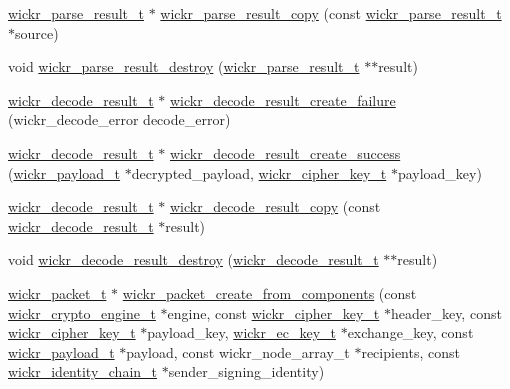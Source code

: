 \begin{DoxyCompactItemize}
\item 
\hyperlink{structwickr__parse__result}{wickr\+\_\+parse\+\_\+result\+\_\+t} $\ast$ \hyperlink{group__wickr__protocol_ga1671066ddc19b38ed05d4460d5a96706}{wickr\+\_\+parse\+\_\+result\+\_\+copy} (const \hyperlink{structwickr__parse__result}{wickr\+\_\+parse\+\_\+result\+\_\+t} $\ast$source)
\item 
void \hyperlink{group__wickr__protocol_ga706d39419c8991f417f37f556cee8df9}{wickr\+\_\+parse\+\_\+result\+\_\+destroy} (\hyperlink{structwickr__parse__result}{wickr\+\_\+parse\+\_\+result\+\_\+t} $\ast$$\ast$result)
\item 
\hyperlink{structwickr__decode__result}{wickr\+\_\+decode\+\_\+result\+\_\+t} $\ast$ \hyperlink{group__wickr__protocol_ga2bd6f49ed993d2290aaafa514eba43ed}{wickr\+\_\+decode\+\_\+result\+\_\+create\+\_\+failure} (wickr\+\_\+decode\+\_\+error decode\+\_\+error)
\item 
\hyperlink{structwickr__decode__result}{wickr\+\_\+decode\+\_\+result\+\_\+t} $\ast$ \hyperlink{group__wickr__protocol_ga633aaf4cb6159be0110401f06dae458c}{wickr\+\_\+decode\+\_\+result\+\_\+create\+\_\+success} (\hyperlink{structwickr__payload}{wickr\+\_\+payload\+\_\+t} $\ast$decrypted\+\_\+payload, \hyperlink{structwickr__cipher__key}{wickr\+\_\+cipher\+\_\+key\+\_\+t} $\ast$payload\+\_\+key)
\item 
\hyperlink{structwickr__decode__result}{wickr\+\_\+decode\+\_\+result\+\_\+t} $\ast$ \hyperlink{group__wickr__protocol_ga36183bf96372661f890aefbe388bd32a}{wickr\+\_\+decode\+\_\+result\+\_\+copy} (const \hyperlink{structwickr__decode__result}{wickr\+\_\+decode\+\_\+result\+\_\+t} $\ast$result)
\item 
void \hyperlink{group__wickr__protocol_ga94154ab44a6c2e9b97a115e37416efe1}{wickr\+\_\+decode\+\_\+result\+\_\+destroy} (\hyperlink{structwickr__decode__result}{wickr\+\_\+decode\+\_\+result\+\_\+t} $\ast$$\ast$result)
\item 
\hyperlink{structwickr__packet}{wickr\+\_\+packet\+\_\+t} $\ast$ \hyperlink{group__wickr__protocol_gaa1b1db03ca4b5b4109825539e6fead2f}{wickr\+\_\+packet\+\_\+create\+\_\+from\+\_\+components} (const \hyperlink{structwickr__crypto__engine}{wickr\+\_\+crypto\+\_\+engine\+\_\+t} $\ast$engine, const \hyperlink{structwickr__cipher__key}{wickr\+\_\+cipher\+\_\+key\+\_\+t} $\ast$header\+\_\+key, const \hyperlink{structwickr__cipher__key}{wickr\+\_\+cipher\+\_\+key\+\_\+t} $\ast$payload\+\_\+key, \hyperlink{structwickr__ec__key}{wickr\+\_\+ec\+\_\+key\+\_\+t} $\ast$exchange\+\_\+key, const \hyperlink{structwickr__payload}{wickr\+\_\+payload\+\_\+t} $\ast$payload, const wickr\+\_\+node\+\_\+array\+\_\+t $\ast$recipients, const \hyperlink{structwickr__identity__chain}{wickr\+\_\+identity\+\_\+chain\+\_\+t} $\ast$sender\+\_\+signing\+\_\+identity)

\end{DoxyCompactItemize}
